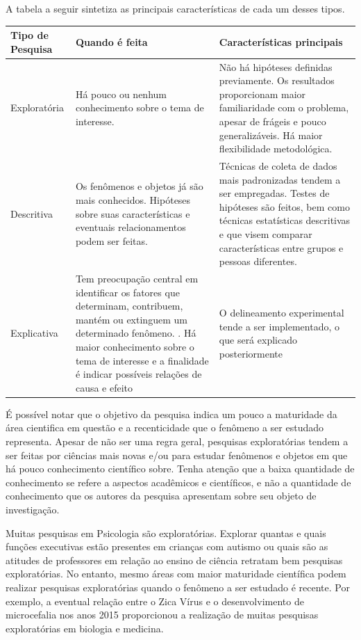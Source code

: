 \documentclass[
]{book}
\begin{document}
A tabela a seguir sintetiza as principais características de cada um desses tipos.

\begin{longtable}[]{@{}
  >{\raggedright\arraybackslash}p{}
  >{\raggedright\arraybackslash}p{}
  >{\raggedright\arraybackslash}p{}@{}}
\toprule
Tipo de Pesquisa & Quando é feita & Características principais \\
\midrule
\endhead
Exploratória & Há pouco ou nenhum conhecimento sobre o tema de interesse. & Não há hipóteses definidas previamente. Os resultados proporcionam maior familiaridade com o problema, apesar de frágeis e pouco generalizáveis. Há maior flexibilidade metodológica. \\
Descritiva & Os fenômenos e objetos já são mais conhecidos. Hipóteses sobre suas características e eventuais relacionamentos podem ser feitas. & Técnicas de coleta de dados mais padronizadas tendem a ser empregadas. Testes de hipóteses são feitos, bem como técnicas estatísticas descritivas e que visem comparar características entre grupos e pessoas diferentes. \\
Explicativa & Tem preocupação central em identificar os fatores que determinam, contribuem, mantém ou extinguem um determinado fenômeno. . Há maior conhecimento sobre o tema de interesse e a finalidade é indicar possíveis relações de causa e efeito & O delineamento experimental tende a ser implementado, o que será explicado posteriormente \\
\bottomrule
\end{longtable}

É possível notar que o objetivo da pesquisa indica um pouco a maturidade da área cientifica em questão e a recenticidade que o fenômeno a ser estudado representa. Apesar de não ser uma regra geral, pesquisas exploratórias tendem a ser feitas por ciências mais novas e/ou para estudar fenômenos e objetos em que há pouco conhecimento científico sobre. Tenha atenção que a baixa quantidade de conhecimento se refere a aspectos acadêmicos e científicos, e não a quantidade de conhecimento que os autores da pesquisa apresentam sobre seu objeto de investigação.

Muitas pesquisas em Psicologia são exploratórias. Explorar quantas e quais funções executivas estão presentes em crianças com autismo \citep{Skogli2020} ou quais são as atitudes de professores em relação ao ensino de ciência \citep{Jones1994} retratam bem pesquisas exploratórias. No entanto, mesmo áreas com maior maturidade científica podem realizar pesquisas exploratórias quando o fenômeno a ser estudado é recente. Por exemplo, a eventual relação entre o Zica Vírus e o desenvolvimento de microcefalia nos anos 2015 proporcionou a realização de muitas pesquisas exploratórias em biologia e medicina.
\end{document}
